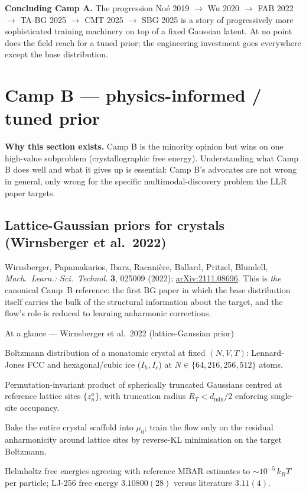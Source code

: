 \documentclass[11pt,letterpaper]{article}
\theoremstyle{plain}
\begin{document}
\begin{callout}
\textbf{Concluding Camp A.} The progression Noé 2019 $\to$ Wu 2020 $\to$ FAB 2022
$\to$ TA-BG 2025 $\to$ CMT 2025 $\to$ SBG 2025 is a story of progressively more
sophisticated training machinery on top of a fixed Gaussian latent. At no point
does the field reach for a tuned prior; the engineering investment goes everywhere
except the base distribution.
\end{callout}

\section{Camp B --- physics-informed / tuned prior}

\begin{callout}
\textbf{Why this section exists.} Camp B is the minority opinion but wins on one
high-value subproblem (crystallographic free energy). Understanding what Camp B
does well and what it gives up is essential: Camp B's advocates are not wrong in
general, only wrong for the specific multimodal-discovery problem the LLR paper
targets.
\end{callout}

\subsection{Lattice-Gaussian priors for crystals (Wirnsberger et al.\ 2022)}
\label{sec:wirnsberger}

Wirnsberger, Papamakarios, Ibarz, Racanière, Ballard, Pritzel, Blundell,
\emph{Mach.\ Learn.: Sci.\ Technol.} \textbf{3}, 025009 (2022);
\href{https://arxiv.org/abs/2111.08696}{arXiv:2111.08696}. This is \emph{the}
canonical Camp~B reference: the first BG paper in which the base distribution
itself carries the bulk of the structural information about the target, and
the flow's role is reduced to learning anharmonic corrections.

\begin{methodbox}{At a glance --- Wirnsberger et al.\ 2022 (lattice-Gaussian prior)}
\begin{description}[leftmargin=2.2em,style=nextline,itemsep=0pt,topsep=2pt]
  \item[Target] Boltzmann distribution of a monatomic crystal at fixed
    $(N, V, T)$: Lennard-Jones FCC and hexagonal/cubic ice ($I_h, I_c$) at
    $N\in\{64, 216, 256, 512\}$ atoms.
  \item[Prior] Permutation-invariant product of spherically truncated
    Gaussians centred at reference lattice sites $\{z^o_n\}$, with
    truncation radius $R_T<d_{\min}/2$ enforcing single-site occupancy.
  \item[New idea] Bake the entire crystal scaffold into $\mu_0$; train the
    flow only on the residual anharmonicity around lattice sites by
    reverse-KL minimisation on the target Boltzmann.
  \item[Headline] Helmholtz free energies agreeing with reference MBAR
    estimates to ${\sim}10^{-5}\,k_BT$ per particle; LJ-256 free energy
    $3.10800(28)$ versus literature $3.11(4)$.
\end{description}
\end{methodbox}
\end{document}
